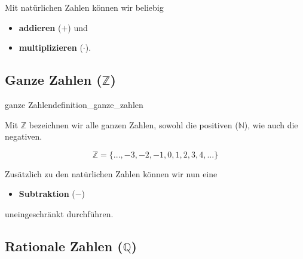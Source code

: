 Mit natürlichen Zahlen können wir beliebig
\begin{itemize}
\item \textbf{addieren} ($+$)  und
\item \textbf{multiplizieren} ($\cdot{}$).
\end{itemize}


\TALS{\newpage}


\subsection{Ganze Zahlen ($\mathbb{Z}$)}
\begin{definition}{ganze Zahlen}{definition_ganze_zahlen}

  Mit $\mathbb{Z}$ bezeichnen wir alle ganzen Zahlen, sowohl die
  positiven ($\mathbb{N}$), wie auch die negativen.
  \end{definition}

$$\mathbb{Z} = \{..., -3, -2, -1, 0, 1, 2, 3,  4, ... \}$$

Zusätzlich zu den natürlichen Zahlen können wir nun eine
\begin{itemize}
\item \textbf{Subtraktion} ($-$)
  \end{itemize}
uneingeschränkt durchführen.

\newpage


\subsection{Rationale Zahlen ($\mathbb{Q}$)}

